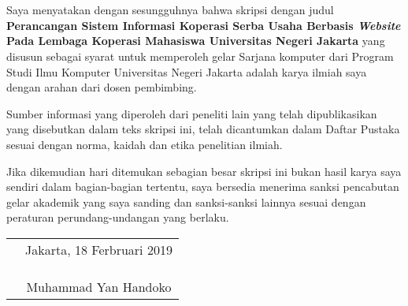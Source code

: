 \chapter*{}

Saya menyatakan dengan sesungguhnya bahwa skripsi dengan judul 	\textbf{Perancangan Sistem Informasi Koperasi Serba Usaha Berbasis \emph{Website} Pada Lembaga Koperasi Mahasiswa Universitas Negeri Jakarta} yang disusun sebagai syarat untuk memperoleh gelar Sarjana komputer dari Program Studi Ilmu Komputer Universitas Negeri Jakarta adalah karya ilmiah saya dengan arahan dari dosen pembimbing.

Sumber informasi yang diperoleh dari peneliti lain yang
telah dipublikasikan yang disebutkan dalam teks skripsi ini, telah dicantumkan dalam Daftar Pustaka sesuai dengan norma, kaidah dan etika penelitian ilmiah.

Jika dikemudian hari ditemukan sebagian besar skripsi ini bukan hasil karya saya sendiri dalam bagian-bagian tertentu, saya bersedia menerima sanksi pencabutan gelar akademik yang saya sanding dan sanksi-sanksi lainnya sesuai dengan peraturan perundang-undangan yang berlaku.

\vspace{.5cm}

\begin{tabular}{p{7.5cm}c}
	&Jakarta, 18 Ferbruari 2019\\
	&\\
	&\\
	&\\
	&Muhammad Yan Handoko
\end{tabular}